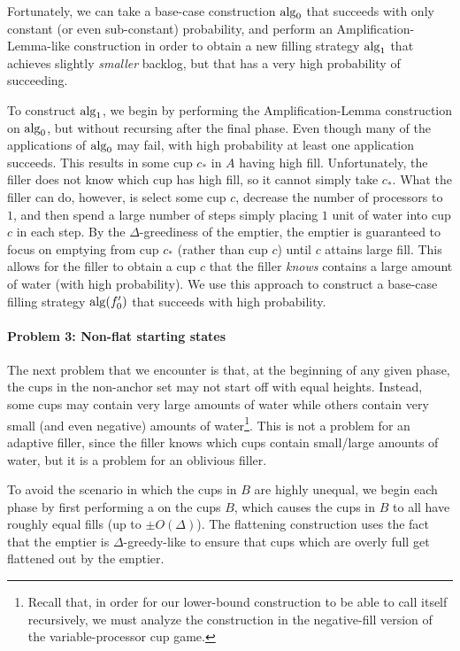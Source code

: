 Fortunately, we can take a base-case construction $\operatorname{\text{\textup{alg}}}_0$ that
succeeds with only constant (or even sub-constant) probability,
and perform an Amplification-Lemma-like construction in order to
obtain a new filling strategy $\operatorname{\text{\textup{alg}}}_1$ that achieves slightly
\emph{smaller} backlog, but that has a very high probability of
succeeding.

To construct $\operatorname{\text{\textup{alg}}}_1$, we begin by performing the
Amplification-Lemma construction on $\operatorname{\text{\textup{alg}}}_0$, but without
recursing after the final phase. Even though many of the
applications of $\operatorname{\text{\textup{alg}}}_0$ may fail, with high probability at least
one application succeeds. This results in some cup $c_*$ in $A$
having high fill. Unfortunately, the filler does not know which
cup has high fill, so it cannot simply take $c_*$. What the
filler can do, however, is select some cup $c$, decrease the
number of processors to $1$, and then spend a large number of
steps simply placing $1$ unit of water into cup $c$ in each step.
By the $\Delta$-greediness of the emptier, the emptier is
guaranteed to focus on emptying from cup $c_*$ (rather than cup
$c$) until $c$ attains large fill. This allows for the filler to
obtain a cup $c$ that the filler \emph{knows} contains a large
amount of water (with high probability). We use this approach to
construct a base-case filling strategy $\operatorname{\text{\textup{alg}}}(f_0')$ that succeeds
with high probability.

\paragraph{Problem 3: Non-flat starting states}
The next problem that we encounter is that, at the beginning of
any given phase, the cups in the non-anchor set may not start off
with equal heights. Instead, some cups may contain very large
amounts of water while others contain very small (and even
negative) amounts of water\footnote{Recall that, in order for our
lower-bound construction to be able to call itself recursively,
we must analyze the construction in the negative-fill version of
the variable-processor cup game.}. This is not a problem for an
adaptive filler, since the filler knows which cups contain
small/large amounts of water, but it is a problem for an
oblivious filler.

To avoid the scenario in which the cups in $B$ are highly unequal, we
begin each phase by first performing a 
on the cups $B$, which causes the cups in $B$ to all have roughly
equal fills (up to $\pm O(\Delta)$). The flattening construction uses
the fact that the emptier is $\Delta$-greedy-like to ensure that cups
which are overly full get flattened out by the emptier.

